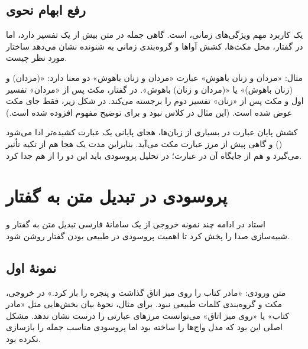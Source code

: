 \subsection{رفع ابهام نحوی}
یک کاربرد مهم ویژگی‌های زمانی،  است. گاهی جمله در متن بیش از یک تفسیر دارد، اما در گفتار، محل مکث‌ها، کشش آواها و گروه‌بندی زمانی به شنونده نشان می‌دهد ساختار مورد نظر چیست.

\begin{addedbox}{مثال: «مردان و زنان باهوش»}
عبارت «مردان و زنان باهوش» دو معنا دارد: «(مردان) و (زنان باهوش)» یا «(مردان و زنان) باهوش». در گفتار، مکث پس از «مردان» تفسیر اول و مکث پس از «زنان» تفسیر دوم را برجسته می‌کند. در شکل زیر، فقط جای مکث عوض شده است. (این مثال در کلاس نبود و برای توضیح مفهوم افزوده شده است.)
\end{addedbox}


\begin{addedbox}{کشش پایان عبارت}
در بسیاری از زبان‌ها، هجای پایانی یک عبارت کشیده‌تر ادا می‌شود () و گاهی پیش از مرز عبارت مکث می‌آید. بنابراین مدت یک هجا هم از تکیه تأثیر می‌گیرد و هم از جایگاه آن در عبارت؛ در تحلیل پروسودی باید این دو را از هم جدا کرد.
\end{addedbox}

\section{پروسودی در تبدیل متن به گفتار}

استاد در ادامه چند نمونه خروجی از یک سامانهٔ فارسی تبدیل متن به گفتار و شبیه‌سازی صدا را پخش کرد تا اهمیت پروسودی در طبیعی بودن گفتار روشن شود.

\subsection{نمونهٔ اول}
متن ورودی: «مادر کتاب را روی میز اتاق گذاشت و پنجره را باز کرد.» در خروجی، مکث و گروه‌بندی کلمات طبیعی نبود. برای مثال، نحوهٔ بیان بخش‌هایی مثل «مادر کتاب» یا «روی میز اتاق» می‌توانست مرزهای عبارتی را درست نشان ندهد. مشکل اصلی این بود که مدل واج‌ها را ساخته بود اما پروسودی مناسب جمله را بازسازی نکرده بود.

